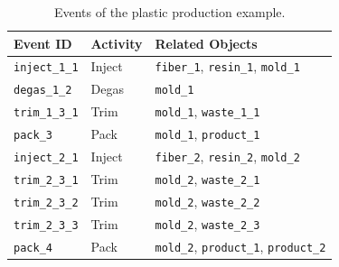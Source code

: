     \begin{table}[htbp]
        \centering
        \begin{tabular}{|>{\columncolor{black!5}}l|l|l|} 
            \hline
            \rowcolor{black!5} 
            \textbf{Event ID} & \textbf{Activity} & \textbf{Related Objects} \\ 
            \hline
            \texttt{inject\_1\_1} & Inject & \texttt{fiber\_1}, \texttt{resin\_1}, \texttt{mold\_1} \\
            \texttt{degas\_1\_2} & Degas & \texttt{mold\_1} \\
            \texttt{trim\_1\_3\_1} & Trim & \texttt{mold\_1}, \texttt{waste\_1\_1} \\
            \texttt{pack\_3} & Pack & \texttt{mold\_1}, \texttt{product\_1} \\
            \hline
            \texttt{inject\_2\_1} & Inject & \texttt{fiber\_2}, \texttt{resin\_2}, \texttt{mold\_2} \\
            \texttt{trim\_2\_3\_1} & Trim & \texttt{mold\_2}, \texttt{waste\_2\_1} \\
            \texttt{trim\_2\_3\_2} & Trim & \texttt{mold\_2}, \texttt{waste\_2\_2} \\
            \texttt{trim\_2\_3\_3} & Trim & \texttt{mold\_2}, \texttt{waste\_2\_3} \\
            \texttt{pack\_4} & Pack & \texttt{mold\_2}, \texttt{product\_1}, \texttt{product\_2} \\
            \hline
        \end{tabular}
    \caption{Events of the plastic production example.}
    \label{table:running-example-table-events}
    \end{table}
    
